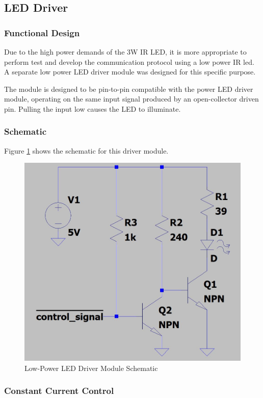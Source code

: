 



\subsection{LED Driver}

\subsubsection{Functional Design}
Due to the high power demands of the 3W IR LED, it is more appropriate to perform test and develop the communication protocol using a low power IR led. A separate low power LED driver module was designed for this specific purpose.

The module is designed to be pin-to-pin compatible with the power LED driver module, operating on the same input signal produced by an open-collector driven pin. Pulling the input low causes the LED to illuminate.



\subsubsection{Schematic}
Figure \ref{fig:schematic_low_power_led_driver} shows the schematic for this driver module.

\begin{figure}[H]
	\centering
	\includegraphics[width=.6\textwidth]{figures/design/low_power_led_driver.JPG}
	\caption{Low-Power LED Driver Module Schematic}
	\label{fig:schematic_low_power_led_driver}
\end{figure}

\subsubsection{Constant Current Control}



